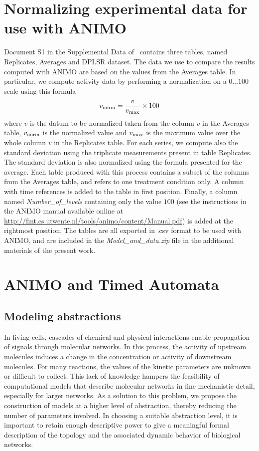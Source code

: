 \documentclass{bmcart}
\begin{document}
\section{Normalizing experimental data for use with ANIMO}\label{suppl-sec:normalization}
Document S1 in the Supplemental Data of~\cite{pathway-autocrine} contains
three tables, named {\sf Replicates}, {\sf Averages} and {\sf DPLSR dataset}.
The data we use to compare the results computed with ANIMO are based on the
values from the {\sf Averages} table.
In particular, we compute activity data by performing a normalization on a $0\dots 100$ scale using this formula
$$
v_{\mbox{\scriptsize norm}} = \frac{v}{v_{\mbox{\scriptsize max}}} \times 100
$$
where $v$ is the datum to be normalized taken from the column $v$ in the {\sf Averages} table,
$v_{\mbox{\scriptsize norm}}$ is the normalized value and
$v_{\mbox{\scriptsize max}}$ is the maximum value over the whole column $v$ in the {\sf Replicates} table.
For each series, we compute also the standard deviation using the triplicate measurements
present in table {\sf Replicates}. The standard deviation is also normalized using the formula presented for the average.
Each table produced with this process contains a subset of the columns from the {\sf Averages} table,
and refers to one treatment condition only. A column with time references is added to the table in first position.
Finally, a column named \emph{Number\_of\_levels} containing only the value $100$ (see the instructions
in the ANIMO manual available online at \url{http://fmt.cs.utwente.nl/tools/animo/content/Manual.pdf}) is added at the rightmost position.
The tables are all exported in .csv format to be used with ANIMO, and are included in the \emph{Model\_and\_data.zip}
file in the additional materials of the present work.


\clearpage
\section{ANIMO and Timed Automata}\label{suppl-sec:animo-ta}
\subsection{Modeling abstractions}\label{subsec:abstractions}

In living cells, cascades of chemical and physical interactions enable propagation of signals through molecular networks.
In this process, the activity of upstream molecules induces a change in the
concentration or activity of downstream molecules. For many reactions, the values of the kinetic parameters
are unknown or difficult to collect. This lack of knowledge hampers the feasibility
of computational models that describe molecular networks in fine mechanistic detail, especially for larger networks.
As a solution to this problem, we propose the construction of models at a higher level of abstraction,
thereby reducing the number of parameters involved. In choosing a suitable abstraction level, it is important to
retain enough descriptive power to give a meaningful formal description of the topology and the
associated dynamic behavior of biological networks.
\end{document}
